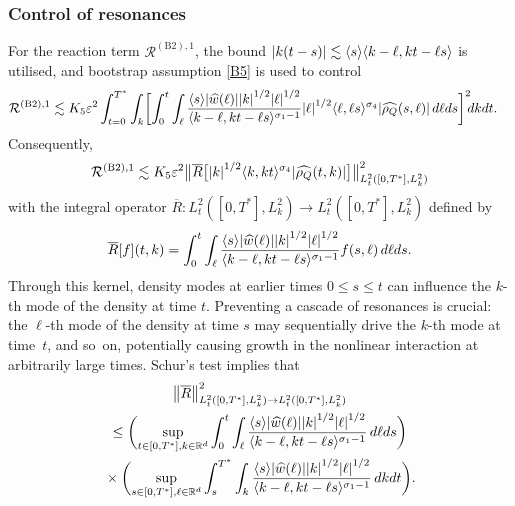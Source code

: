 \documentclass[JEP,XML,SOM,Unicode]{cedram}
\newcommand{\bnorm}[1]{\bigl\|#1\bigr\|}
\theoremstyle{plain}
\theoremstyle{remark}
\newcommand{\bbbr}[1]{\biggl(#1 \biggr)}
\newcommand{\ak}{\abs{k}}
\newcommand{\sbbr}[1]{\bigl[#1\bigr]}
\newcommand{\sbbbr}[1]{\biggl[#1\biggr]}
\newcommand{\jb}[1]{\langle#1\rangle}
\newcommand{\ep}{\varepsilon}
\newcommand{\R}{\mathbb{R}}
\begin{document}
\subsubsection{Control of resonances}\label{resonancessection}
For the reaction term $\mathcal{R}^{\mathrm{(B2),1}}$, the bound $\abs{k(t-s)}\lesssim\jb{s}\jb{k-\ell,kt-\ell s}$ is utilised, and bootstrap assumption \eqref{B5} is used to control\vspace*{-3pt}
\begin{align*}
\mathcal{R}^{\mathrm{(B2),1}}&\lesssim K_5\ep^2\int_{t=0}^{T^*}\int_k\sbbbr{\int_0^t\int_\ell\frac{\jb{s}\abs{\widehat w(\ell)}\ak^{1/2} \abs{\ell}^{1/2}}{\jb{k-\ell,kt-\ell s}^{\sigma_1-1}}\abs{\ell}^{1/2}\jb{\ell,\ell s}^{\sigma_4}\abs{\widehat{\rho_Q}(s,\ell)}\,d\ell ds}^2\hspace{-0.1cm}dkdt.
\end{align*}
Consequently,\vspace*{-3pt}
\begin{align}\label{tobeapplied}\mathcal{R}^{\mathrm{(B2),1}}\lesssim K_5\ep^2\bnorm{\overline R\sbbr{\abs{k}^{1/2}\jb{k,kt}^{\sigma_4}\abs{\widehat{\rho_Q}(t,k)}}}_{L^2_{t}([0,T^*],L^2_k)}^2\end{align} with the integral operator $\overline R\colon L^2_{t}([0,T^*],L^2_k)\to L^2_{t}([0,T^*],L^2_k)$ defined by\vspace*{-3pt}
\begin{align}\label{Rintegraloperator}
\overline R[f](t,k)=\int_0^t\int_\ell\frac{\jb{s}\abs{\widehat w(\ell)}\ak^{1/2} \abs{\ell}^{1/2}}{\jb{k-\ell,kt-\ell s}^{\sigma_1-1}}f(s,\ell)\,d\ell ds.
\end{align}
Through this kernel, density modes at earlier times $0\leq s\leq t$ can influence the $k$\nobreakdash-th mode of the density at time $t$. Preventing a cascade of resonances is crucial: the $\ell$\nobreakdash-th mode of the density at time $s$ may sequentially drive the $k$-th mode at time~$t$, and so~on, potentially causing growth in the nonlinear interaction at arbitrarily large times. Schur's test implies that\vspace*{-5pt}
\begin{multline}\label{Schurintegrals}
\norm{\overline R}_{L^2_{t}([0,T^*],L^2_k)\to L^2_{t}([0,T^*],L^2_k)}^2\\
\leq \bbbr{\sup_{t\in[0,T^*],k\in\R^d}\int_0^t\int_\ell \frac{\jb{ s }\abs{\widehat w(\ell)}\ak^{1/2}\abs{\ell}^{1/2}}{\jb{k-\ell,kt-\ell s }^{\sigma_1-1}}\,d\ell d s }\\
{}\times\bbbr{\sup_{ s \in[0,T^*],\ell\in\R^d}\int_{ s }^{T^*}\int_k \frac{\jb{ s }\abs{\widehat w(\ell)}\ak^{1/2}\abs{\ell}^{1/2}}{\jb{k-\ell,kt-\ell s }^{\sigma_1-1}}\,dk d t }.
\end{multline}
\end{document}

